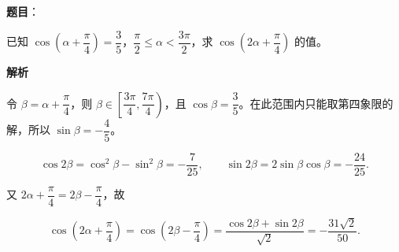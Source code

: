 \begin{answer}

\textbf{题目}：

已知 $\cos\left(\alpha+\dfrac\pi4\right)=\dfrac35$，$\dfrac\pi2\leqslant\alpha<\dfrac{3\pi}2$，求 $\cos\left(2\alpha+\dfrac\pi4\right)$ 的值。

\textbf{解析}

令 $\beta=\alpha+\dfrac\pi4$，则 $\beta\in\left[\dfrac{3\pi}4,\dfrac{7\pi}4\right)$，且 $\cos\beta=\dfrac35$。在此范围内只能取第四象限的解，所以 $\sin\beta=-\dfrac45$。

\nopagebreak[4]
\[
\cos2\beta=\cos^2\beta-\sin^2\beta=-\frac7{25},\qquad
\sin2\beta=2\sin\beta\cos\beta=-\frac{24}{25}.
\]

又 $2\alpha+\dfrac\pi4=2\beta-\dfrac\pi4$，故

\nopagebreak[4]
\[
\cos\left(2\alpha+\frac\pi4\right)
=\cos\left(2\beta-\frac\pi4\right)
=\frac{\cos2\beta+\sin2\beta}{\sqrt2}
=-\frac{31\sqrt2}{50}.
\]


\end{answer}
